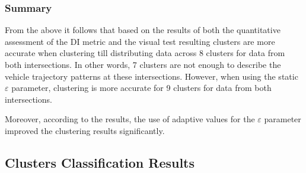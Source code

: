 \subsubsection{Summary}

From the above it follows that based on the results of both the quantitative assessment of the DI metric and the visual test resulting clusters are more accurate when clustering till distributing data across 8 clusters for data from both intersections. In other words, 7 clusters are not enough to describe the vehicle trajectory patterns at these intersections. However, when using the static $\varepsilon$ parameter, clustering is more accurate for 9 clusters for data from both intersections.

Moreover, according to the results, the use of adaptive values for the $\varepsilon$ parameter improved the clustering results significantly.

\subsection{Clusters Classification Results}

